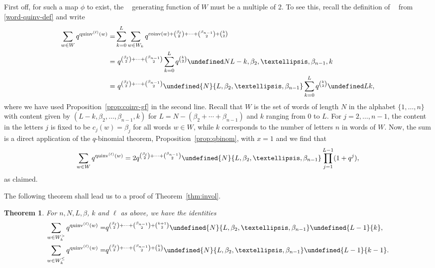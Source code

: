 \documentclass[11pt]{article}
\newtheorem{theorem}[theo]{Theorem}
\theoremstyle{definition}
\providecommand{\qbinom}[2]{\genfrac{[}{]}{0pt}{}{#1}{#2}}
\numberwithin{equation}{section}
\DeclareMathOperator{\coinv}{coinv}
\DeclareMathOperator{\quinvL}{\quinv^{(\ell)}}
\DeclareMathOperator{\quinv}{quinv}
\let\qbinom\undefined
\newcommand{\qbinom}[2]{\bgroup\renewcommand*{\arraystretch}{1}\begin{bmatrix} #1 \\ #2\end{bmatrix} \egroup}
\begin{document}
First off, for such a map $\phi$ to exist, the $\quinvL$ generating function of $W$ must be a multiple
of 2. To see this, recall the definition of $\quinvL$ from \eqref{word-quinv-def} and write
\begin{align*}
\sum_{w \in W} q^{\quinvL(w)} =& \sum_{k=0}^L \sum_{w \in W_k} q^{\coinv(w) + \binom{\beta_\ell}{2} + \cdots + \binom{\beta_{n-1}}{2} + \binom{k}{2} } \\
=&\ q^{\binom{\beta_\ell}{2} + \cdots + \binom{\beta_{n-1}}{2}} \sum_{k=0}^L q^{\binom{k}{2}} \qbinom N{L-k,\beta_2,\dots, \beta_{n-1},k} \\
=&\ q^{\binom{\beta_\ell}{2} + \cdots + \binom{\beta_{n-1}}{2}} \qbinom{N}{L,\beta_2,\dots,\beta_{n-1}} \sum_{k=0}^L q^{\binom{k}{2}} \qbinom Lk,
\end{align*}
where we have used Proposition~\ref{prop:coinv-gf} in the second line. Recall that $W$ is the set of words of length $N$ in the alphabet $\{1,\ldots,n\}$ with content given by $(L-k,\beta_2,\ldots,\beta_{n-1},k)$ for $L=N-(\beta_2+\cdots+\beta_{n-1})$ and $k$ ranging from $0$ to $L$. For $j=2,\ldots,n-1$, the content in the letters $j$ is fixed to be $c_j(w)=\beta_j$ for all words $w\in W$, while $k$ corresponds to the number of letters $n$ in words of $W$. Now, the sum is a direct application 
of the $q$-binomial theorem, Proposition~\ref{prop:qbinom}, with $x=1$ and we find that
\[
\sum_{w \in W} q^{\quinvL(w)} = 2 q^{\binom{\beta_\ell}{2} + \cdots + \binom{\beta_{n-1}}{2}}  \qbinom{N}{L,\beta_2,\dots,\beta_{n-1}} \prod_{j=1}^{L-1} (1 + q^j),
\]
as claimed.

The following theorem shall lead us to a proof of Theorem~\ref{thm:invol}.

\begin{theorem}
\label{thm:quinv-gf}
For $n, N, L, \beta$, $k$ and $\ell$ as above, we have the identities
\begin{align}
\label{quinv-gf>}
\sum_{w \in W_k^>} q^{\quinvL(w)} =& q^{\binom{\beta_\ell}{2} + \cdots + \binom{\beta_{n-1}}{2} + \binom{k+1}{2}} \qbinom{N}{L,\beta_2,\dots,\beta_{n-1}} \qbinom{L-1}{k}, \\
\label{quinv-gf<}
\sum_{w \in W_k^\leq} q^{\quinvL(w)} =& q^{\binom{\beta_\ell}{2} + \cdots + \binom{\beta_{n-1}}{2} + \binom{k}{2}} \qbinom{N}{L,\beta_2,\dots,\beta_{n-1}} \qbinom{L-1}{k-1}.
\end{align}
\end{theorem}
\end{document}
